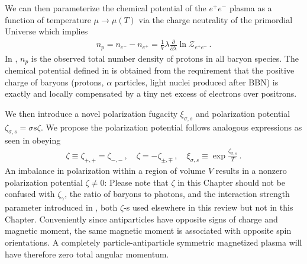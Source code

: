 We can then parameterize the chemical potential of the $e^{+}e^{-}$ plasma as a function of temperature $\mu\rightarrow\mu(T)$ via the charge neutrality of the primordial Universe which implies
\begin{align}
 \label{chargeneutrality}
 n_{p}=n_{e^{-}}-n_{e^{+}}=\frac{1}{V}\lambda\frac{\partial}{\partial\lambda}\ln\mathcal{Z}_{e^{+}e^{-}}\,.
\end{align}
In , $n_{p}$ is the observed total number density of protons in all baryon species. The chemical potential defined in  is obtained from the requirement that the positive charge of baryons (protons, $\alpha$ particles, light nuclei produced after BBN) is exactly and locally compensated by a tiny net excess of electrons over positrons.

We then introduce a novel polarization fugacity $\xi_{\sigma,s}$ and polarization potential $\zeta_{\sigma,s}=\sigma s\zeta$. We propose the polarization potential follows analogous expressions as seen in  obeying
\begin{align}
 \label{spotential}
 \zeta\equiv\zeta_{+,+}=\zeta_{-,-}\,,\quad\zeta=-\zeta_{\pm,\mp}\,,\quad\xi_{\sigma,s}\equiv\exp{\frac{\zeta_{\sigma,s}}{T}}\,.
\end{align}
An imbalance in polarization within a region of volume $V$ results in a nonzero polarization potential $\zeta\neq0$: {\color{blue}Please note that $\zeta$ in this Chapter should not be confused with $\zeta_\gamma$, the ratio of baryons to photons, and the interaction strength parameter introduced in , both $\zeta$-s used elsewhere in this review but not in this Chapter}. Conveniently since antiparticles have opposite signs of charge and magnetic moment, the same magnetic moment is associated with opposite spin orientations. A completely particle-antiparticle symmetric magnetized plasma will have therefore zero total angular momentum.


